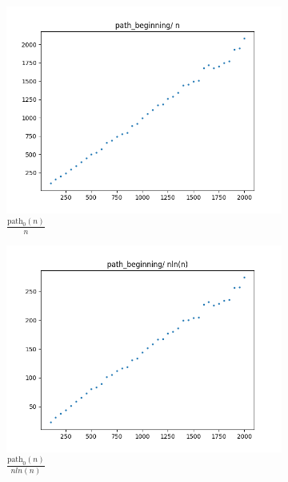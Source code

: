 \documentclass{article}
\begin{document}
\begin{figure}[H]
  \centering
  \begin{subfigure}{.475\textwidth}
    \centering
    \includegraphics[width=\textwidth]{path_beginning_n.png}
    \caption{\( \frac{\text{path}_0(n)}{n} \)}
    \label{fig:path_beginning_n}
  \end{subfigure}%
  \begin{subfigure}{.475\textwidth}
    \centering
    \includegraphics[width=\textwidth]{path_beginning_nlnn.png}
    \caption{\( \frac{\text{path}_0(n)}{nln(n)} \)}
    \label{fig:path_beginning_nlnn}
  \end{subfigure}%
  \hfill
  \begin{subfigure}{.475\textwidth}

\end{subfigure}
\end{figure}
\end{document}
